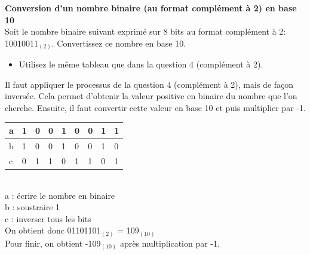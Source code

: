 \newpage
\begin{Exercice}[5 minutes] \textbf{Conversion d'un nombre binaire (au format complément à 2) en base 10 \optionnel}\\
    
    Soit le nombre binaire suivant exprimé sur 8 bits au format complément à 2: 10010011$_{(2)}$. Convertissez ce nombre en base 10. \\
	
    \begin{conseil}
    
    \begin{itemize}
    	\item Utilisez le même tableau que dans la question 4 (complément à 2).
    \end{itemize}
    
    \end{conseil}
    
    \begin{solution}
       Il faut appliquer le processus de la question 4 (complément à 2), mais de façon inversée. Cela permet d'obtenir la valeur positive en binaire du nombre que l'on cherche. Ensuite, il faut convertir cette valeur en base 10 et puis multiplier par -1. \\
       
       \begin{tabular}{| p{1cm} | p{1cm} | p{1cm} | p{1cm} | p{1cm} | p{1cm} | p{1cm} | p{1cm} | p{1cm} |} 
            \hline
            a & 1 & 0 & 0 & 1 & 0 & 0 & 1 & 1 \\ [0.5ex] 
            \hline
            b & 1 & 0 & 0 & 1 & 0 & 0 & 1 & 0 \\ [0.5ex]
            \hline
            c & 0 & 1 & 1 & 0 & 1 & 1 & 0 & 1 \\ [0.5ex]
            \hline
        \end{tabular} \\
        
        a : écrire le nombre en binaire \\
        
        b : soustraire 1 \\
        
        c : inverser tous les bits \\
        
        On obtient donc 01101101$_{(2)}$ = 109$_{(10)}$ \\
        
        Pour finir, on obtient -109$_{(10)}$ après multiplication par -1.
       
    \end{solution}
\end{Exercice}

